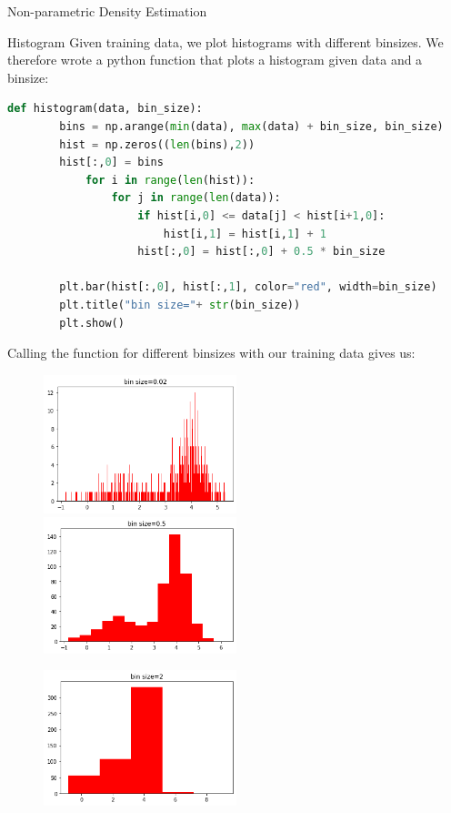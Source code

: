\documentclass[
ngerman,
]{tudaexercise}
\begin{document}
\begin{task}{Non-parametric Density Estimation}
	\begin{subtask}{Histogram}
		Given training data, we plot histograms with different binsizes. We therefore wrote a python function that plots a histogram given data and a binsize:
		\begin{lstlisting}[language=Python]
	def histogram(data, bin_size):
		bins = np.arange(min(data), max(data) + bin_size, bin_size)
		hist = np.zeros((len(bins),2))
		hist[:,0] = bins
			for i in range(len(hist)):
				for j in range(len(data)):
					if hist[i,0] <= data[j] < hist[i+1,0]:
						hist[i,1] = hist[i,1] + 1
					hist[:,0] = hist[:,0] + 0.5 * bin_size

		plt.bar(hist[:,0], hist[:,1], color="red", width=bin_size)
		plt.title("bin size="+ str(bin_size))       
		plt.show()
		\end{lstlisting}
		Calling the function for different binsizes with our training data gives us:
		\begin{figure}[H]
		\includegraphics[width=0.5\textwidth]{h002.png}
		\includegraphics[width=0.5\textwidth]{h05.png}\end{figure} \begin{figure}[H]
		\includegraphics[width=0.5\textwidth]{h2.png}

\end{figure}
\end{subtask}
\end{task}
\end{document}
